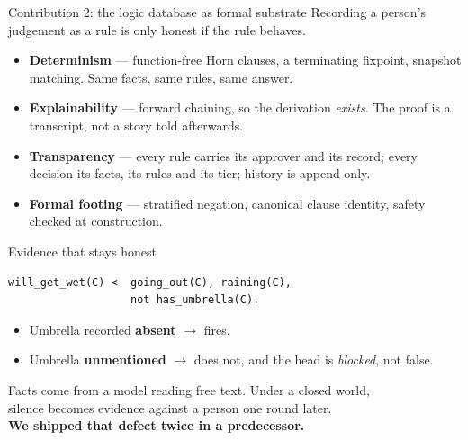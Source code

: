 \documentclass[aspectratio=169,11pt]{beamer}
\begin{document}
\begin{frame}{Contribution 2: the logic database as formal substrate}
  \vspace{1em}
  Recording a person's judgement as a rule is only honest if the rule behaves.
  \vspace{1.1em}
  \begin{itemize}\setlength\itemsep{.65em}
    \item \textbf{Determinism} --- function-free Horn clauses, a terminating
      fixpoint, snapshot matching. Same facts, same rules, same answer.
    \item \textbf{Explainability} --- forward chaining, so the derivation
      \emph{exists}. The proof is a transcript, not a story told afterwards.
    \item \textbf{Transparency} --- every rule carries its approver and its
      record; every decision its facts, its rules and its tier; history is
      append-only.
    \item \textbf{Formal footing} --- stratified negation, canonical clause
      identity, safety checked at construction.
  \end{itemize}
\end{frame}

\begin{frame}[fragile]{Evidence that stays honest}
  \vspace{.6em}
\begin{lstlisting}
will_get_wet(C) <- going_out(C), raining(C),
                   not has_umbrella(C).
\end{lstlisting}
  \vspace{.8em}
  \begin{itemize}\setlength\itemsep{.5em}
    \item Umbrella recorded \textbf{absent} $\rightarrow$ fires.
    \item Umbrella \textbf{unmentioned} $\rightarrow$ does not, and the head is
      \emph{blocked}, not false.
  \end{itemize}
  \vspace{1.1em}
  \pause
  \begin{center}\color{muted}
    Facts come from a model reading free text. Under a closed world,\\
    silence becomes evidence against a person one round later.\\[.4em]
    {\color{brick}\textbf{We shipped that defect twice in a predecessor.}}
  \end{center}
\end{frame}
\end{document}
